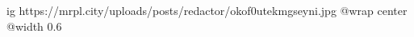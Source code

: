  
 
 
 
 

\ifcmt
  ig https://mrpl.city/uploads/posts/redactor/okof0utekmgseyni.jpg
  @wrap center
  @width 0.6
\fi
